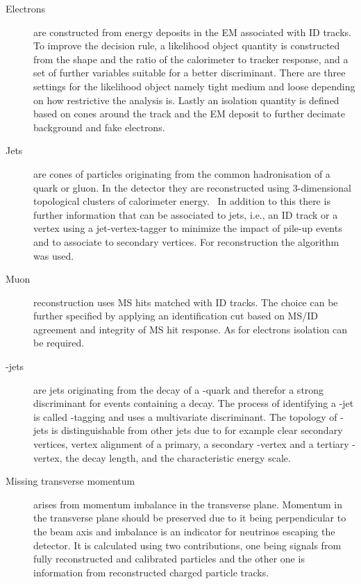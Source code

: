 \begin{description}
\item[Electrons] 
are constructed from energy deposits in the EM associated with ID tracks.
To improve the decision rule, a likelihood object quantity is constructed from the shape and the ratio of the calorimeter to tracker response, and a set of further variables suitable for a better discriminant. There are three settings for the likelihood object namely tight medium and loose depending on how restrictive the analysis is.
Lastly an isolation quantity is defined based on cones around the track and the EM deposit to further decimate background and fake electrons.~\cite{ATLAS-CONF-2016-024}
\item[Jets] are cones of particles originating from the common hadronisation of a quark or gluon. In the detector they are reconstructed using 3-dimensional topological clusters of calorimeter energy.~\cite{Aad:2016upy} In addition to this there is further information that can be associated to jets, {i.e.}, an ID track or a vertex using a jet-vertex-tagger to minimize the impact of pile-up events and to associate to secondary vertices. For reconstruction the \antikt algorithm was used.~\cite{Cacciari:2008gp}
\item[Muon] reconstruction uses MS hits matched with ID tracks. The choice can be further specified by applying an identification cut based on MS/ID agreement and integrity of MS hit response. As for electrons isolation can be required.~\cite{Aad:2016jkr}
\item[\Pbottom-jets] are jets originating from the decay of a \Pbottom-quark and therefor a strong discriminant for events containing a \Ptop decay. The process of identifying a \Pbottom-jet is called \Pbottom-tagging and uses a multivariate discriminant. The topology of \Pbottom-jets is distinguishable from other jets due to for example clear secondary vertices, vertex alignment of a primary, a secondary \Pbottom-vertex and a tertiary \Pcharm-vertex, the decay length, and the characteristic energy scale.~\cite{Aad:2110203, ATL-PHYS-PUB-2016-012}
\item[Missing transverse momentum]
arises from momentum imbalance in the transverse plane. Momentum in the transverse plane should be preserved due to it being perpendicular to the beam axis and imbalance is an indicator for neutrinos escaping the detector. It is calculated using two contributions, one being signals from fully reconstructed and calibrated particles and the other one is information from reconstructed charged particle tracks. ~\cite{Aaboud:2018tkc}  
\end{description}

